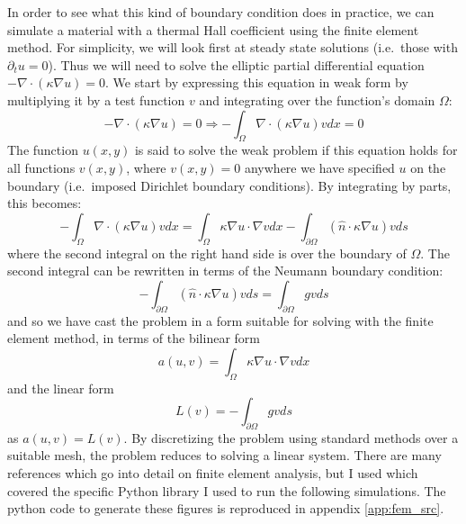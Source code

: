 \documentclass{thesis-umich}
\begin{document}
In order to see what this kind of boundary condition does in practice,
we can simulate a material with a thermal Hall coefficient using the
finite element method. For simplicity, we will look first at steady
state solutions (i.e.~those with \(\partial_t u = 0\)). Thus we will
need to solve the elliptic partial differential equation
\(-\nabla \cdot (\kappa \nabla u) = 0\). We start by expressing this
equation in weak form by multiplying it by a test function \(v\) and
integrating over the function's domain \(\Omega\):
\[ -\nabla \cdot (\kappa \nabla u) = 0 \Rightarrow -\int_\Omega \nabla \cdot
(\kappa \nabla u) v dx = 0 \] The function \(u(x,y)\) is said to solve
the weak problem if this equation holds for all functions \(v(x,y)\),
where \(v(x, y) = 0\) anywhere we have specified \(u\) on the boundary
(i.e.~imposed Dirichlet boundary conditions). By integrating by parts,
this becomes:
\[ - \int_\Omega \nabla \cdot (\kappa \nabla u) v dx = \int_\Omega \kappa \nabla
u \cdot \nabla v dx - \int_{\partial \Omega} (\hat{n} \cdot \kappa\nabla u) v ds\]
where the second integral on the right hand side is over the boundary of
\(\Omega\). The second integral can be rewritten in terms of the Neumann
boundary condition:
\[ - \int_{\partial\Omega} (\hat{n} \cdot \kappa \nabla u) v ds =
\int_{\partial\Omega} g v ds\] and so we have cast the problem in a form
suitable for solving with the finite element method, in terms of the
bilinear form
\[ a(u, v) = \int_\Omega \kappa \nabla u \cdot \nabla v dx \] and the
linear form \[ L(v) = -\int_{\partial \Omega} g v ds \] as
\(a(u, v) = L(v)\). By discretizing the problem using standard methods
over a suitable mesh, the problem reduces to solving a linear system.
There are many references which go into detail on finite element
analysis, but I used \cite{LangtangenLogg2017} which covered the
specific Python library I used to run the following simulations. The python code to generate these figures is reproduced in appendix \ref{app:fem_src}.
\end{document}
